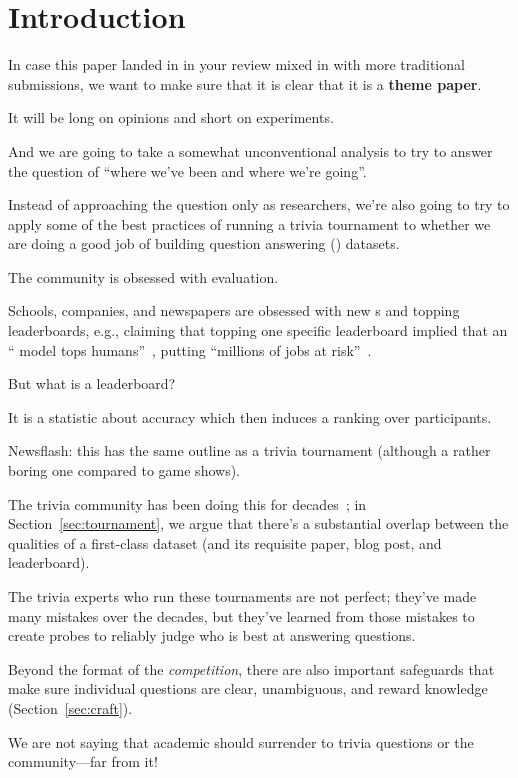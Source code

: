 


\section{Introduction}


In case this paper landed in in your review mixed in with more traditional  submissions, we want to make sure that it is clear that it is a {\bf theme paper}.

It will be long on opinions and short on experiments.

And we are going to take a somewhat unconventional analysis to try to answer the question of ``where we've been and where we're going''.

Instead of approaching the question only as  researchers, we're also going to try to apply some of the best practices of running a trivia tournament to whether we are doing a good job of building question answering () datasets.

The \qa{} community is obsessed with evaluation.

Schools, companies, and newspapers are obsessed with new s and
topping leaderboards, e.g., claiming that topping one specific leaderboard implied that an `` model tops humans''~\cite{najberg-18}, putting ``millions of jobs at risk''~\cite{cuthbertson-18}.

But what is a leaderboard? 

It is a statistic about \qa{} accuracy which then induces a ranking over participants.

Newsflash: this has the same outline as a trivia tournament (although a rather boring one compared to game shows).  

The trivia community has been doing this for decades~\cite{jennings-06}; in
Section~\ref{sec:tournament}, we argue that there's a substantial
overlap between the qualities of a first-class  dataset (and
its requisite paper, blog post, and leaderboard).

The trivia experts who run these tournaments are not perfect; they've
made many mistakes over the decades, but they've learned from those
mistakes to create probes to reliably judge who is best at answering
questions.

Beyond the format of the \emph{competition}, there are also important
safeguards that make sure individual questions are clear, unambiguous,
and reward knowledge (Section~\ref{sec:craft}).

We are not saying that academic  should surrender to trivia questions or the community---far from it!

